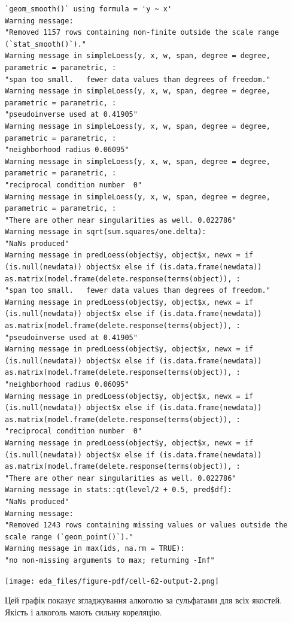 \documentclass[
  letterpaper,
  DIV=11,
  numbers=noendperiod]{scrreprt}
\begin{document}
\begin{verbatim}
`geom_smooth()` using formula = 'y ~ x'
Warning message:
"Removed 1157 rows containing non-finite outside the scale range (`stat_smooth()`)."
Warning message in simpleLoess(y, x, w, span, degree = degree, parametric = parametric, :
"span too small.   fewer data values than degrees of freedom."
Warning message in simpleLoess(y, x, w, span, degree = degree, parametric = parametric, :
"pseudoinverse used at 0.41905"
Warning message in simpleLoess(y, x, w, span, degree = degree, parametric = parametric, :
"neighborhood radius 0.06095"
Warning message in simpleLoess(y, x, w, span, degree = degree, parametric = parametric, :
"reciprocal condition number  0"
Warning message in simpleLoess(y, x, w, span, degree = degree, parametric = parametric, :
"There are other near singularities as well. 0.022786"
Warning message in sqrt(sum.squares/one.delta):
"NaNs produced"
Warning message in predLoess(object$y, object$x, newx = if (is.null(newdata)) object$x else if (is.data.frame(newdata)) as.matrix(model.frame(delete.response(terms(object)), :
"span too small.   fewer data values than degrees of freedom."
Warning message in predLoess(object$y, object$x, newx = if (is.null(newdata)) object$x else if (is.data.frame(newdata)) as.matrix(model.frame(delete.response(terms(object)), :
"pseudoinverse used at 0.41905"
Warning message in predLoess(object$y, object$x, newx = if (is.null(newdata)) object$x else if (is.data.frame(newdata)) as.matrix(model.frame(delete.response(terms(object)), :
"neighborhood radius 0.06095"
Warning message in predLoess(object$y, object$x, newx = if (is.null(newdata)) object$x else if (is.data.frame(newdata)) as.matrix(model.frame(delete.response(terms(object)), :
"reciprocal condition number  0"
Warning message in predLoess(object$y, object$x, newx = if (is.null(newdata)) object$x else if (is.data.frame(newdata)) as.matrix(model.frame(delete.response(terms(object)), :
"There are other near singularities as well. 0.022786"
Warning message in stats::qt(level/2 + 0.5, pred$df):
"NaNs produced"
Warning message:
"Removed 1243 rows containing missing values or values outside the scale range (`geom_point()`)."
Warning message in max(ids, na.rm = TRUE):
"no non-missing arguments to max; returning -Inf"
\end{verbatim}

\texttt{[image: eda\_files/figure-pdf/cell-62-output-2.png]}

Цей графік показує згладжування алкоголю за сульфатами для всіх якостей.
Якість і алкоголь мають сильну кореляцію.
\end{document}
